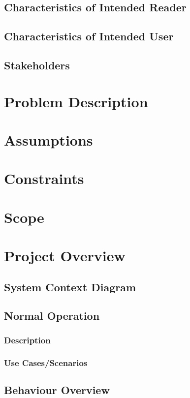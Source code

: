 \documentclass[12pt]{article}
\begin{document}
\subsection{Characteristics of Intended Reader}
\subsection{Characteristics of Intended User}
\subsection{Stakeholders}

\section{Problem Description}

\section{Assumptions}

\section{Constraints}

\section{Scope}

\section{Project Overview}
\subsection{System Context Diagram}
\subsection{Normal Operation}
\subsubsection{Description}
\subsubsection{Use Cases/Scenarios}

\subsection{Behaviour Overview}
\end{document}
